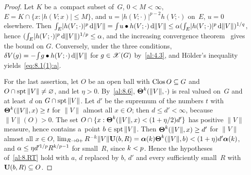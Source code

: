 \begin{proof}
    Let $K$ be a~compact subset of~$G$, $0 < M < \infty$, $E = K \cap \{ x : |h(V;x)| \le M \}$, and
    $u = |h(V;\cdot)|^{p-2} h(V;\cdot)$ on~$E$, $u = 0$ elsewhere. Then ${\textstyle\int_{E}^{}} |h(V;\cdot)|^p
    \,\mathrm{d} \|V\| = {\textstyle\int_{}^{}} u \bullet h(V;\cdot) \,\mathrm{d} \|V\| \le \alpha ({\textstyle\int_{E}^{}}
    |h(V;\cdot)|^p \,\mathrm{d} \|V\|)^{1/q}$, hence $({\textstyle\int_{E}^{}} |h(V;\cdot)|^p \,\mathrm{d} \|V\|)^{1/p} \le
    \alpha$, and the increasing convergence theorem~\cite[2.4.7]{Federer1969} gives the bound
    on $G$. Conversely, under the three conditions, $\delta V(g) = - {\textstyle\int_{}^{}} g \bullet
    h(V;\cdot) \,\mathrm{d} \|V\|$ for $g \in \mathscr{X}(G)$ by~\ref{al:4.3}, and H\"older's
    inequality~\cite[2.4.14]{Federer1969} yields~\eqref{eq:8.1(1):a}.

    For the last assertion, let $O$ be an open ball with $\mathop{\mathrm{Clos}}O \subseteq G$ and $O \cap \operatorname{spt} \|V\|
    \ne \varnothing$, and let $\eta > 0$. By~\ref{al:8.6}, $\boldsymbol{\Theta}^{k}(\|V\|,\cdot)$ is real
    valued on~$G$ and at least~$d$ on $G \cap \operatorname{spt} \|V\|$. Let $d'$ be the supremum of the numbers
    $t$ with $\boldsymbol{\Theta}^{k}(\|V\|,x) \ge t$ for $\|V\|$ almost all $x \in O$; then $d \le d' <
    \infty$, because $\|V\|(O) > 0$. The set $O \cap \{ x : \boldsymbol{\Theta}^{k}(\|V\|,x) < (1 + \eta/2)
    d' \}$ has positive $\|V\|$ measure, hence contains a~point $b \in \operatorname{spt} \|V\|$. Then
    $\boldsymbol{\Theta}^{k}(\|V\|,x) \ge d'$ for $\|V\|$ almost all $x \in O$, $\lim_{R \to 0+} R^{-k}
    \|V\| \mathbf{U}(b,R) = \boldsymbol{\alpha}(k) \boldsymbol{\Theta}^{k}(\|V\|,b) < (1 + \eta) d'
    \boldsymbol{\alpha}(k)$, and $\alpha \le \eta d'^{1/p} R^{k/p - 1}$ for small~$R$, since
    $k < p$. Hence the hypotheses of~\ref{al:8.RT} hold with $a$, $d$ replaced by $b$, $d'$ and
    every sufficiently small~$R$ with $\mathbf{U}(b,R) \subseteq O$.
\end{proof}


